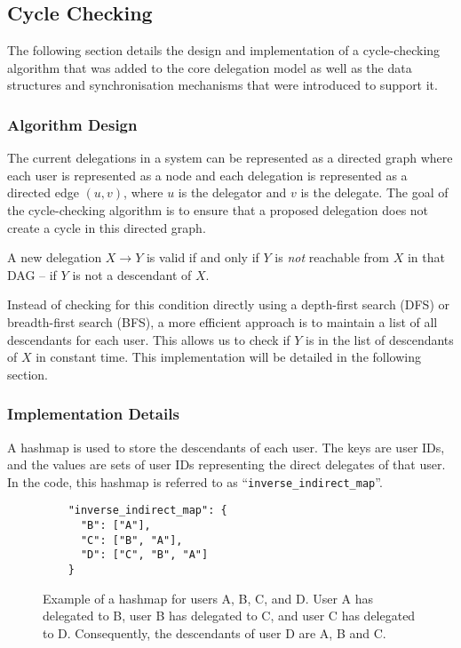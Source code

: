 \subsection{Cycle Checking}
The following section details the design and implementation of a cycle-checking algorithm that was added to the core delegation model as well as the data structures and synchronisation mechanisms that were introduced to support it.
\subsubsection{Algorithm Design}
The current delegations in a system can be represented as a directed graph where each user is represented as a node and each delegation is represented as a directed edge $(u,v)$, where $u$ is the delegator and $v$ is the delegate. The goal of the cycle-checking algorithm is to ensure that a proposed delegation does not create a cycle in this directed graph.

A new delegation $X\to Y$ is valid if and only if $Y$ is \emph{not} reachable from $X$ in that DAG -- if $Y$ is not a descendant of $X$.

Instead of checking for this condition directly using a depth-first search (DFS) or breadth-first search (BFS), a more efficient approach is to maintain a list of all descendants for each user. This allows us to check if $Y$ is in the list of descendants of $X$ in constant time. This implementation will be detailed in the following section.

\subsubsection{Implementation Details}
A hashmap is used to store the descendants of each user. The keys are user IDs, and the values are sets of user IDs representing the direct delegates of that user. In the code, this hashmap is referred to as ``\verb|inverse_indirect_map|''.
\begin{figure}[H]
  \centering
  \begin{verbatim}
    "inverse_indirect_map": {
      "B": ["A"],
      "C": ["B", "A"],
      "D": ["C", "B", "A"]
    }
  \end{verbatim}
  \caption{Example of a hashmap for users A, B, C, and D. User A has delegated to B, user B has delegated to C, and user C has delegated to D. Consequently, the descendants of user D are A, B and C.}
  \label{fig:inverse_indirect_map}
\end{figure}

